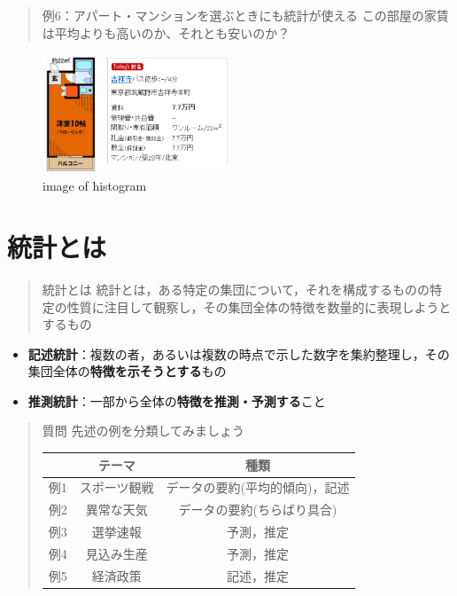 \documentclass[
]{book}
\providecommand{\tightlist}{%
  \setlength{\itemsep}{0pt}\setlength{\parskip}{0pt}}
\theoremstyle{definition}
\theoremstyle{definition}
\theoremstyle{definition}
\theoremstyle{definition}
\theoremstyle{remark}
\begin{document}
\begin{quote}
例6：アパート・マンションを選ぶときにも統計が使える
この部屋の家賃は平均よりも高いのか、それとも安いのか？
\end{quote}

\begin{figure}
\centering
\includegraphics[width=0.5\textwidth,height=\textheight]{images/lec01/fig_kichi_1room_example.png}
\caption{image of histogram}
\end{figure}

\hypertarget{ux7d71ux8a08ux3068ux306f}{%
\section{統計とは}\label{ux7d71ux8a08ux3068ux306f}}

\begin{quote}
統計とは
統計とは，ある特定の集団について，それを構成するものの特定の性質に注目して観察し，その集団全体の特徴を数量的に表現しようとするもの
\end{quote}

\begin{itemize}
\tightlist
\item
  \textbf{記述統計}：複数の者，あるいは複数の時点で示した数字を集約整理し，その集団全体の\textbf{特徴を示そうとする}もの
\item
  \textbf{推測統計}：一部から全体の\textbf{特徴を推測・予測する}こと
\end{itemize}

\begin{quote}
質問
先述の例を分類してみましょう

\begin{longtable}[]{@{}ccc@{}}
\toprule()
& テーマ & 種類 \\
\midrule()
\endhead
例1 & スポーツ観戦 & データの要約(平均的傾向)，記述 \\
例2 & 異常な天気 & データの要約(ちらばり具合) \\
例3 & 選挙速報 & 予測，推定 \\
例4 & 見込み生産 & 予測，推定 \\
例5 & 経済政策 & 記述，推定 \\
\bottomrule()
\end{longtable}
\end{quote}
\end{document}
